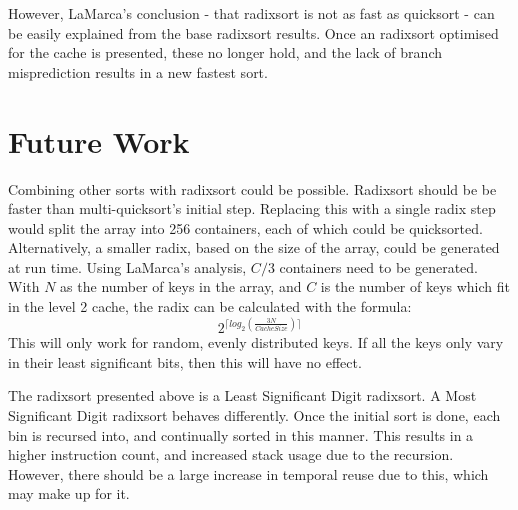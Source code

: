 However, LaMarca's conclusion - that radixsort is not as fast as quicksort - can
be easily explained from the base radixsort results. Once an radixsort optimised
for the cache is presented, these no longer hold, and the lack of branch
misprediction results in a new fastest sort.

\section{Future Work}
\label{radix future work}
Combining other sorts with radixsort could be possible.  Radixsort should be be
faster than multi-quicksort's initial step. Replacing this with a single radix
step would split the array into 256 containers, each of which could be
quicksorted. Alternatively, a smaller radix, based on the size of the array,
could be generated at run time. Using LaMarca's analysis, $C/3$ containers need
to be generated. With $N$ as the number of keys in the array, and $C$ is the
number of keys which fit in the level 2 cache, the radix can be calculated with
the formula:
$$2^{\lceil{}log_2(\frac{3N}{CacheSize})\rceil{}}$$
This will only work for random, evenly distributed keys. If all the keys only
vary in their least significant bits, then this will have no effect.

The radixsort presented above is a Least Significant Digit radixsort. A Most
Significant Digit radixsort behaves differently. Once the initial sort is done,
each bin is recursed into, and continually sorted in this manner. This results
in a higher instruction count, and increased stack usage due to the recursion.
However, there should be a large increase in temporal reuse due to this, which
may make up for it.

